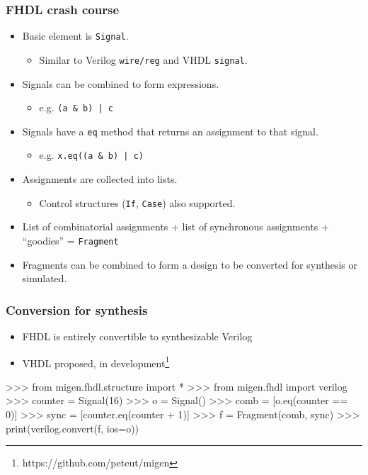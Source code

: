 \documentclass[serif,mathserif]{beamer}
\begin{document}
\begin{frame}[fragile]
\frametitle{FHDL crash course}
\begin{itemize}
\item Basic element is \verb!Signal!.
\begin{itemize}
\item Similar to Verilog \verb!wire/reg! and VHDL \verb!signal!.
\end{itemize}
\item Signals can be combined to form expressions.
\begin{itemize}
\item e.g. \verb!(a & b) | c!
\end{itemize}
\item Signals have a \verb!eq! method that returns an assignment to that signal.
\begin{itemize}
\item e.g. \verb!x.eq((a & b) | c)!
\end{itemize}
\item Assignments are collected into lists.
\begin{itemize}
\item Control structures (\verb!If!, \verb!Case!) also supported.
\end{itemize}
\item List of combinatorial assignments + list of synchronous assignments + ``goodies'' = \verb!Fragment!
\item Fragments can be combined to form a design to be converted for synthesis or simulated.
\end{itemize}
\end{frame}

\begin{frame}[fragile]
\frametitle{Conversion for synthesis}
\begin{itemize}
\item FHDL is entirely convertible to synthesizable Verilog 
\item VHDL proposed, in development\footnote{https://github.com/peteut/migen}
\end{itemize}
\begin{verbatimtab}
>>> from migen.fhdl.structure import *
>>> from migen.fhdl import verilog
>>> counter = Signal(16)
>>> o = Signal()
>>> comb = [o.eq(counter == 0)]
>>> sync = [counter.eq(counter + 1)]
>>> f = Fragment(comb, sync)
>>> print(verilog.convert(f, ios={o}))
\end{verbatimtab}
\end{frame}
\end{document}
